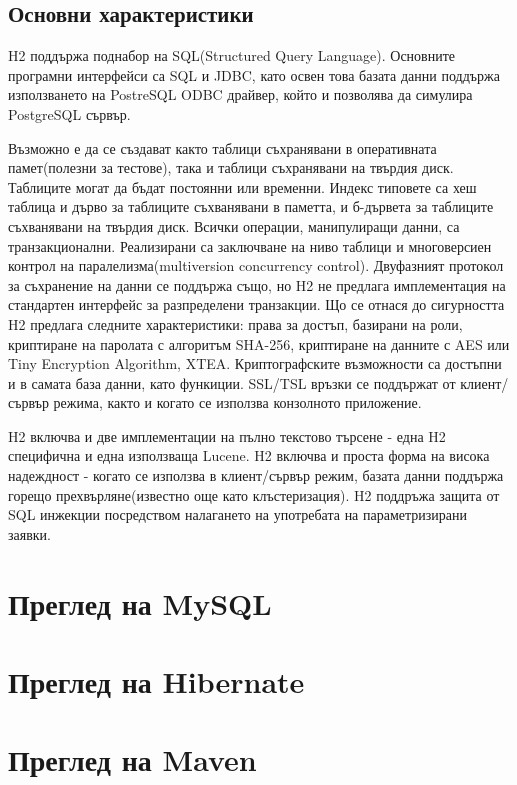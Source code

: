 \subsection{Основни характеристики}
H2 поддържа поднабор на SQL(Structured Query Language). Основните
програмни интерфейси са SQL и JDBC, като освен това базата данни
поддържа използването на PostreSQL ODBC драйвер, който и позволява да
симулира PostgreSQL сървър.

Възможно е да се създават както таблици съхранявани в оперативната
памет(полезни за тестове), така и таблици съхранявани на твърдия
диск. Таблиците могат да бъдат постоянни или временни. Индекс типовете
са хеш таблица и дърво за таблиците съхванявани в паметта, и б-дървета
за таблиците съхванявани на твърдия диск. Всички операции,
манипулиращи данни, са транзакционални. Реализирани са заключване на
ниво таблици и многоверсиен контрол на паралелизма(multiversion
concurrency control). Двуфазният протокол за съхранение на данни се
поддържа също, но H2 не предлага имплементация на стандартен интерфейс
за разпределени транзакции. Що се отнася до сигурността H2 предлага
следните характеристики: права за достъп, базирани на роли, криптиране
на паролата с алгоритъм SHA-256, криптиране на данните с AES или Tiny
Encryption Algorithm, XTEA. Криптографските възможности са достъпни и
в самата база данни, като функиции. SSL/TSL връзки се поддържат от
клиент/сървър режима, както и когато се използва конзолното
приложение.

H2 включва и две имплементации на пълно текстово търсене - една H2
специфична и една използваща Lucene. H2 включва и проста форма на
висока надеждност - когато се използва в клиент/сървър режим, базата
данни поддържа горещо прехвърляне(известно още като клъстеризация). H2
поддръжа защита от SQL инжекции посредством налагането на употребата
на параметризирани заявки.  
\section{Преглед на MySQL}
\section{Преглед на Hibernate}
\section{Преглед на Maven}
